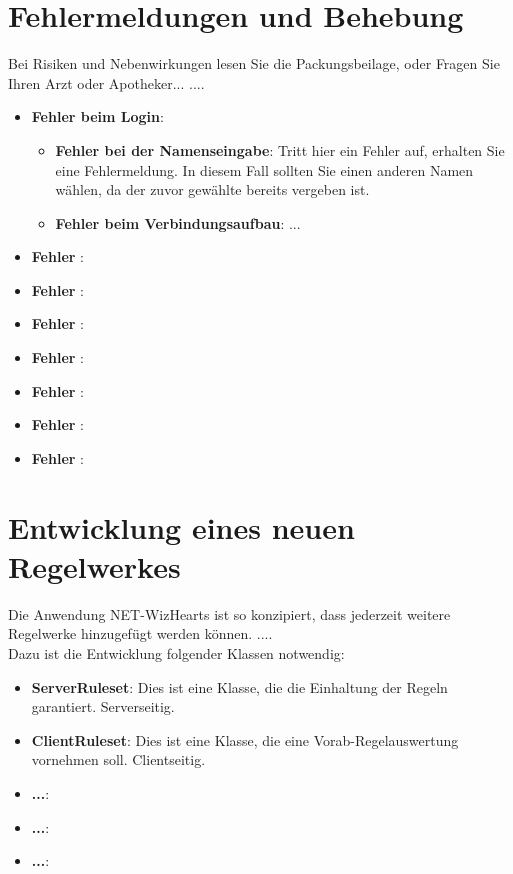 \documentclass[titlepage,10pt,a4paper]{article}
\begin{document}
\section{Fehlermeldungen und Behebung}
Bei Risiken und Nebenwirkungen lesen Sie die Packungsbeilage, oder Fragen Sie Ihren Arzt oder Apotheker...
....\\
\begin{itemize}
\item \textbf{Fehler beim Login}:
	\begin{itemize}
	\item \textbf{Fehler bei der Namenseingabe}:
		Tritt hier ein Fehler auf, erhalten Sie eine Fehlermeldung. In diesem Fall sollten Sie einen anderen Namen wählen, da der zuvor gewählte bereits vergeben ist.
	\item \textbf{Fehler beim Verbindungsaufbau}:
	...
	\end{itemize}
\item \textbf{Fehler }:
\item \textbf{Fehler }:
\item \textbf{Fehler }:
\item \textbf{Fehler }:
\item \textbf{Fehler }:
\item \textbf{Fehler }:
\item \textbf{Fehler }:
\end{itemize}


\section{Entwicklung eines neuen \gls{Regelwerk}es}
Die Anwendung NET-WizHearts ist so konzipiert, dass jederzeit weitere \gls{Regelwerk}e hinzugefügt werden können.
....\\
Dazu ist die Entwicklung folgender Klassen notwendig:
\begin{itemize}
\item \textbf{ServerRuleset}: Dies ist eine Klasse, die die Einhaltung der Regeln garantiert. Serverseitig.
\item \textbf{ClientRuleset}: Dies ist eine Klasse, die eine Vorab-Regelauswertung vornehmen soll. Clientseitig. 
\item \textbf{...}:
\item \textbf{...}:
\item \textbf{...}:
\end{itemize}

\newpage
\printglossaries
\end{document}
